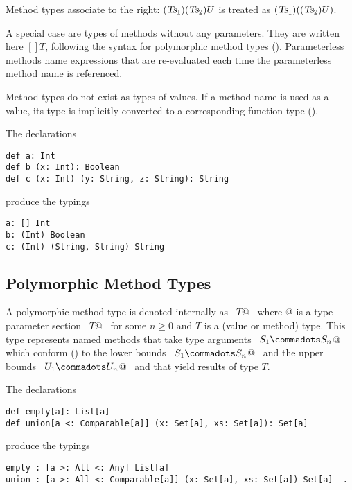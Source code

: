 \documentclass[a4paper,12pt,twoside,titlepage]{book}
\newcommand{\tps}{\mbox{\sl tps}}
\newcommand{\Ts}{\mbox{\sl Ts}}
\begin{document}
Method types associate to the right: $(\Ts_1)(\Ts_2)U$ is treated as
$(\Ts_1)((\Ts_2)U)$.

A special case are types of methods without any parameters. They are
written here $[]T$, following the syntax for polymorphic method types
(). Parameterless methods name expressions that
are re-evaluated each time the parameterless method name is
referenced.

Method types do not exist as types of values. If a method name is used
as a value, its type is implicitly converted to a corresponding
function type ().

\example The declarations
\begin{lstlisting}
def a: Int
def b (x: Int): Boolean
def c (x: Int) (y: String, z: String): String
\end{lstlisting}
produce the typings
\begin{lstlisting}
a: [] Int
b: (Int) Boolean
c: (Int) (String, String) String
\end{lstlisting}

\subsection{Polymorphic Method Types}
\label{sec:poly-types}

A polymorphic method type is denoted internally as ~\lstinline@[$\tps\,$]$T$@~ where
\lstinline@[$\tps\,$]@ is a type parameter section 
~\lstinline@[$a_1$ <: $L_1$ >: $U_1 \commadots a_n$ <: $L_n$ >: $U_n$] $T$@~ 
for some $n \geq 0$ and $T$ is a
(value or method) type.  This type represents named methods that
take type arguments ~\lstinline@$S_1 \commadots S_n$@~ which
conform () to the lower bounds
~\lstinline@$S_1 \commadots S_n$@~ and the upper bounds
~\lstinline@$U_1 \commadots U_n$@~ and that yield results of type $T$.

\example The declarations
\begin{lstlisting}
def empty[a]: List[a]
def union[a <: Comparable[a]] (x: Set[a], xs: Set[a]): Set[a]
\end{lstlisting}
produce the typings
\begin{lstlisting}
empty : [a >: All <: Any] List[a]
union : [a >: All <: Comparable[a]] (x: Set[a], xs: Set[a]) Set[a]  .
\end{lstlisting}
\end{document}
